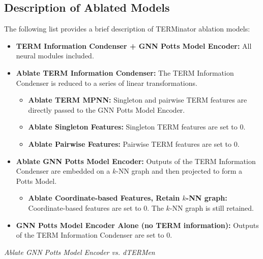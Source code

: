 \documentclass{article}
\begin{document}
\subsection*{Description of Ablated Models}

The following list provides a brief description of TERMinator ablation models:
\begin{itemize}
    \item \textbf{TERM Information Condenser + GNN Potts Model Encoder:} All neural modules included.
    \item \textbf{Ablate TERM Information Condenser:} The TERM Information Condenser is reduced to a series of linear transformations.
    \begin{itemize}
        \item \textbf{Ablate TERM MPNN:} Singleton and pairwise TERM features are directly passed to the GNN Potts Model Encoder.
        \item \textbf{Ablate Singleton Features:} Singleton TERM features are set to 0.
        \item \textbf{Ablate Pairwise Features:} Pairwise TERM features are set to 0.
    \end{itemize}
    \item \textbf{Ablate GNN Potts Model Encoder:} Outputs of the TERM Information Condenser are embedded on a $k$-NN graph and then projected to form a Potts Model.
    \begin{itemize}
        \item \textbf{Ablate Coordinate-based Features, Retain $k$-NN graph:} Coordinate-based features are set to 0. The $k$-NN graph is still retained.
    \end{itemize}
    \item \textbf{GNN Potts Model Encoder Alone (no TERM information):} Outputs of the TERM Information Condenser are set to 0.

\end{itemize}   
\textit{Ablate GNN Potts Model Encoder vs. dTERMen}
\end{document}

